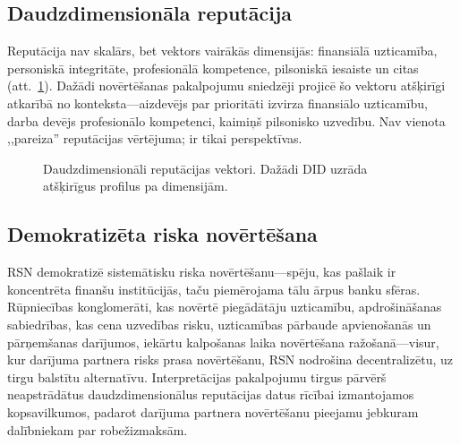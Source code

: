\documentclass[11pt,a4paper,twocolumn]{article}
\begin{document}
\subsection{Daudzdimensionāla reputācija}

Reputācija nav skalārs, bet vektors vairākās dimensijās: finansiālā uzticamība, personiskā integritāte, profesionālā kompetence, pilsoniskā iesaiste un citas (att.~\ref{fig:reputation-radar}). Dažādi novērtēšanas pakalpojumu sniedzēji projicē šo vektoru atšķirīgi atkarībā no konteksta---aizdevējs par prioritāti izvirza finansiālo uzticamību, darba devējs profesionālo kompetenci, kaimiņš pilsonisko uzvedību. Nav vienota ,,pareiza'' reputācijas vērtējuma; ir tikai perspektīvas.

\begin{figure}[ht]
\centering
{}
\caption{Daudzdimensionāli reputācijas vektori. Dažādi DID uzrāda atšķirīgus profilus pa dimensijām.}
\label{fig:reputation-radar}
\end{figure}

\subsection{Demokratizēta riska novērtēšana}

RSN demokratizē sistemātisku riska novērtēšanu---spēju, kas pašlaik ir koncentrēta finanšu institūcijās, taču piemērojama tālu ārpus banku sfēras. Rūpniecības konglomerāti, kas novērtē piegādātāju uzticamību, apdrošināšanas sabiedrības, kas cena uzvedības risku, uzticamības pārbaude apvienošanās un pārņemšanas darījumos, iekārtu kalpošanas laika novērtēšana ražošanā---visur, kur darījuma partnera risks prasa novērtēšanu, RSN nodrošina decentralizētu, uz tirgu balstītu alternatīvu. Interpretācijas pakalpojumu tirgus pārvērš neapstrādātus daudzdimensionālus reputācijas datus rīcībai izmantojamos kopsavilkumos, padarot darījuma partnera novērtēšanu pieejamu jebkuram dalībniekam par robežizmaksām.
\end{document}

